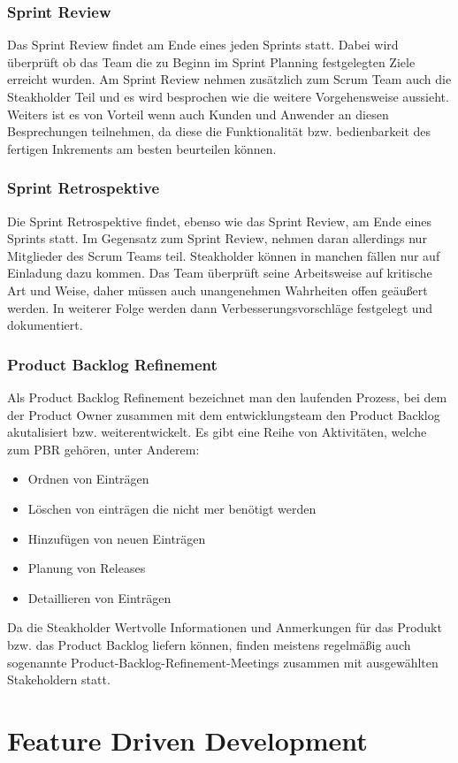 \documentclass[a4paper, twopage]{scrreprt}
\begin{document}
\subsection{Sprint Review}
Das Sprint Review findet am Ende eines jeden Sprints statt. Dabei wird überprüft ob das Team die zu Beginn im Sprint Planning festgelegten Ziele erreicht wurden. Am Sprint Review nehmen zusätzlich zum Scrum Team auch die Steakholder Teil und es wird besprochen wie die weitere Vorgehensweise aussieht. Weiters ist es von Vorteil wenn auch Kunden und Anwender an diesen Besprechungen teilnehmen, da diese die Funktionalität bzw. bedienbarkeit des fertigen Inkrements am besten beurteilen können.
\subsection{Sprint Retrospektive}
Die Sprint Retrospektive findet, ebenso wie das Sprint Review, am Ende eines Sprints statt. Im Gegensatz zum Sprint Review, nehmen daran allerdings nur Mitglieder des Scrum Teams teil. Steakholder können in manchen fällen nur auf Einladung dazu kommen. Das Team überprüft seine Arbeitsweise auf kritische Art und Weise, daher müssen auch unangenehmen Wahrheiten offen geäußert werden. In weiterer Folge werden dann Verbesserungsvorschläge festgelegt und dokumentiert.
\subsection{Product Backlog Refinement}
Als Product Backlog Refinement bezeichnet man den laufenden Prozess, bei dem der Product Owner zusammen mit dem entwicklungsteam den Product Backlog akutalisiert bzw. weiterentwickelt.
Es gibt eine Reihe von Aktivitäten, welche zum PBR gehören, unter Anderem:
\begin{itemize}
	\item Ordnen von Einträgen
	\item Löschen von einträgen die nicht mer benötigt werden
	\item Hinzufügen von neuen Einträgen
	\item Planung von Releases
	\item Detaillieren von Einträgen
\end{itemize}
Da die Steakholder Wertvolle Informationen und Anmerkungen für das Produkt bzw. das Product Backlog liefern können, finden meistens regelmäßig auch sogenannte Product-Backlog-Refinement-Meetings zusammen mit ausgewählten Stakeholdern statt.

\chapter{Feature Driven Development}
\end{document}
